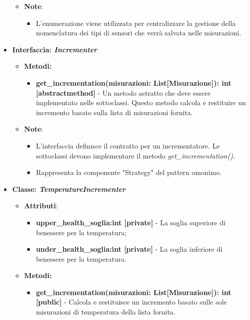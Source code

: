 \begin{itemize}
\begin{itemize}
            \item \textbf{Note}:
            \begin{itemize}
                \item L'enumerazione viene utilizzata per centralizzare la gestione della nomenclatura dei tipi di sensori che verrà salvata nelle misurazioni.
            \end{itemize}
        \end{itemize}
\item \textbf{Interfaccia: \textit{Incrementer}}
    \begin{itemize}
    \item \textbf{Metodi: }
    \begin{itemize}
        \item \textbf{get\_incrementation(misurazioni: List[Misurazione]): int [abstractmethod]} - Un metodo astratto che deve essere implementato nelle sottoclassi. Questo metodo calcola e restituire un incremento basato sulla lista di misurazioni fornita.
    \end{itemize}
    \item\textbf{Note}:
        \begin{itemize}
            \item L'interfaccia definisce il contratto per un incrementatore. Le sottoclassi devono implementare il metodo \textit{get\_incrementation()}.
            \item Rappresenta la componente "Strategy" del pattern omonimo.
        \end{itemize}
    \end{itemize}
    \item \textbf{Classe: \textit{TemperatureIncrementer}}
    \begin{itemize}
    \item \textbf{Attributi}:
        \begin{itemize}
        \item \textbf{upper\_health\_soglia:int [private]} - La soglia superiore di benessere per la temperatura;
        \item \textbf{under\_health\_soglia:int [private]} - La soglia inferiore di benessere per la temperatura.
    \end{itemize}
    \item \textbf{Metodi: }
    \begin{itemize}
        \item \textbf{get\_incrementation(misurazioni: List[Misurazione]): int [public]} - Calcola e restituisce un incremento basato sulle sole misurazioni di temperatura della lista fornita.

\end{itemize}
\end{itemize}
\end{itemize}
